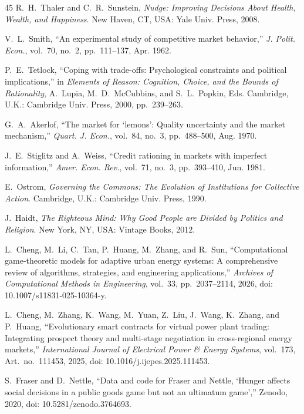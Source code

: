 \documentclass[journal]{IEEEtran}
\begin{document}
\begin{thebibliography}{45}
R.~H.~Thaler and C.~R.~Sunstein, \emph{Nudge: Improving Decisions About Health, Wealth, and Happiness}.
New Haven, CT, USA: Yale Univ. Press, 2008.

V.~L.~Smith, ``An experimental study of competitive market behavior,''
\emph{J. Polit. Econ.}, vol.~70, no.~2, pp.~111--137, Apr. 1962.

P.~E.~Tetlock, ``Coping with trade-offs: Psychological constraints and political implications,''
in \emph{Elements of Reason: Cognition, Choice, and the Bounds of Rationality},
A.~Lupia, M.~D.~McCubbins, and S.~L.~Popkin, Eds.
Cambridge, U.K.: Cambridge Univ. Press, 2000, pp.~239--263.

G.~A.~Akerlof, ``The market for `lemons': Quality uncertainty and the market mechanism,''
\emph{Quart. J. Econ.}, vol.~84, no.~3, pp.~488--500, Aug. 1970.

J.~E.~Stiglitz and A.~Weiss, ``Credit rationing in markets with imperfect information,''
\emph{Amer. Econ. Rev.}, vol.~71, no.~3, pp.~393--410, Jun. 1981.

E.~Ostrom, \emph{Governing the Commons: The Evolution of Institutions for Collective Action}.
Cambridge, U.K.: Cambridge Univ. Press, 1990.

J.~Haidt, \emph{The Righteous Mind: Why Good People are Divided by Politics and Religion}.
New York, NY, USA: Vintage Books, 2012.


L.~Cheng, M.~Li, C.~Tan, P.~Huang, M.~Zhang, and R.~Sun, ``Computational game-theoretic models for adaptive urban energy systems: A comprehensive review of algorithms, strategies, and engineering applications,''
\emph{Archives of Computational Methods in Engineering}, vol.~33, pp.~2037--2114, 2026, doi: 10.1007/s11831-025-10364-y.

L.~Cheng, M.~Zhang, K.~Wang, M.~Yuan, Z.~Liu, J.~Wang, K.~Zhang, and P.~Huang, ``Evolutionary smart contracts for virtual power plant trading: Integrating prospect theory and multi-stage negotiation in cross-regional energy markets,''
\emph{International Journal of Electrical Power \& Energy Systems}, vol.~173, Art.~no.~111453, 2025, doi: 10.1016/j.ijepes.2025.111453.

S.~Fraser and D.~Nettle, ``Data and code for Fraser and Nettle, `Hunger affects social decisions in a public goods game but not an ultimatum game',''
Zenodo, 2020, doi: 10.5281/zenodo.3764693.


\end{thebibliography}
\end{document}

